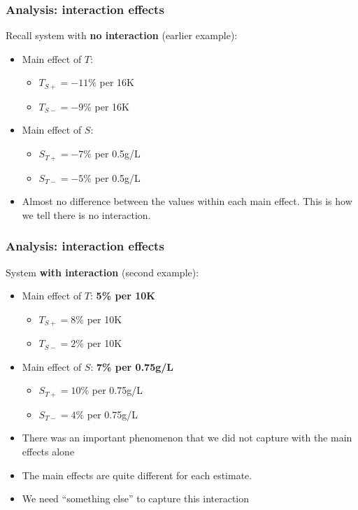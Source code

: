 \begin{frame}\frametitle{Analysis: interaction effects}

	Recall system with \textbf{no interaction} (earlier example):
	\begin{itemize}
		\item	Main effect of $T$:
		\begin{itemize}
			\item	$T_{S+} = -11\%$ per 16K
			\item	$T_{S-} = -9\%$ per 16K
		\end{itemize}
		\item	Main effect of $S$:
		\begin{itemize}
			\item	$S_{T+} = -7\%$ per 0.5g/L
			\item	$S_{T-} = -5\%$ per 0.5g/L
		\end{itemize}
		
		\vspace{12pt}
		\item	Almost no difference between the values within each main effect. This is how we tell there is no interaction.
	\end{itemize}
\end{frame}

\begin{frame}\frametitle{Analysis: interaction effects}

	System \textbf{with interaction} (second example):
	\begin{itemize}
		\item	Main effect of $T$: \textbf{5\% per 10K}
		\begin{itemize}
			\item	$T_{S+} = 8\%$ per 10K
			\item	$T_{S-} = 2\%$ per 10K
		\end{itemize}
		\item	Main effect of $S$: \textbf{7\% per 0.75g/L}
		\begin{itemize}
			\item	$S_{T+} = 10\%$ per 0.75g/L
			\item	$S_{T-} = 4\%$ per 0.75g/L
		\end{itemize}
		
		\vspace{12pt}
		\item	There was an important phenomenon that we did not capture with the main effects alone
		\item	The main effects are quite different for each estimate.
		\item	We need ``something else'' to capture this interaction
	\end{itemize}
\end{frame}

